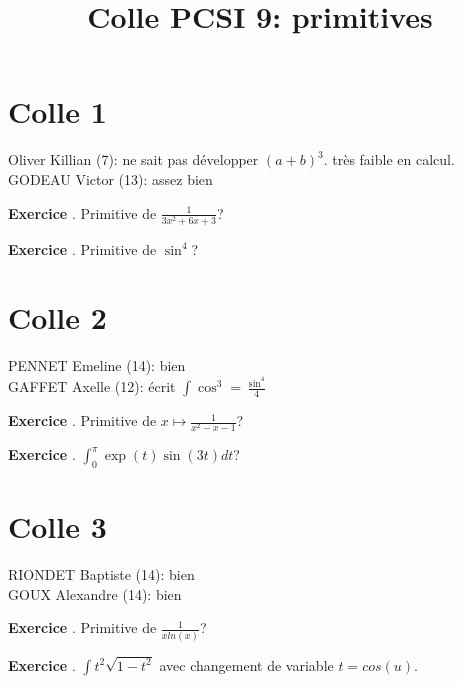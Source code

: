 \documentclass[10pt,a4paper]{article}
\title{Colle PCSI 9: primitives}
\newcounter{question}
\newcounter{exo}
\newenvironment{exo}{\vspace{0.5cm}\setcounter{question}{0}\addtocounter{exo}{1} \noindent \textbf{Exercice \theexo}. \normalsize }{\par}
\begin{document}
	\maketitle

	\section*{Colle 1}
	Oliver Killian (7): ne sait pas développer $(a+b)^3$. très faible en calcul.\\
	GODEAU Victor (13): assez bien\\
	
	\begin{exo}
		Primitive de $\frac{1}{3x^2+6x+3}$?
	\end{exo}
	
	\begin{exo}
		Primitive de $\sin^4$?
	\end{exo}	
	
	\section*{Colle 2}
	\setcounter{exo}{0}
	PENNET Emeline (14): bien\\
	GAFFET Axelle (12): écrit $\int \cos^3 = \frac{\sin^4}{4}$\\
	
	\begin{exo}
		Primitive de $x \longmapsto \frac{1}{x^2 - x - 1}$?
	\end{exo}
	
	\begin{exo}
		$\int_{0}^{\pi} \exp(t) \sin(3t) dt$?
	\end{exo}	
	\section*{Colle 3}
	\setcounter{exo}{0}
	RIONDET Baptiste (14): bien\\
	GOUX Alexandre (14): bien\\
	
	\begin{exo}
		Primitive de $\frac{1}{xln(x)}$?
	\end{exo}

	\begin{exo}
		$\int t^2 \sqrt{1 - t^2}$ avec changement de variable $t = cos(u)$.
	\end{exo}
	
\end{document}
